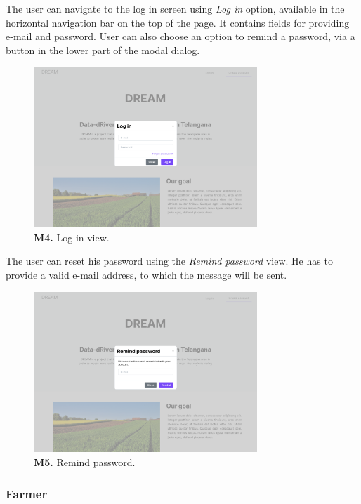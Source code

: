     The user can navigate to the log in screen using \textit{Log in} option, available in the horizontal navigation bar on the top of the page. It contains fields for providing e-mail and password. User can also choose an option to remind a password, via a button in the lower part of the modal dialog.
    \begin{figure}[H]
        \centering
        \includegraphics[width=0.75\textwidth]{mockups/Unreg. user_Log in.png}
        \caption{\textbf{M4.} Log in view.}
        \label{fig:user-log-in}
    \end{figure}
    
    The user can reset his password using the \textit{Remind password} view. He has to provide a valid e-mail address, to which the message will be sent.
    \begin{figure}[H]
        \centering
        \includegraphics[width=0.75\textwidth]{mockups/Unreg. user_Remind password.png}
        \caption{\textbf{M5.} Remind password.}
        \label{fig:user-remind-password}
    \end{figure}
    
    
    \subsubsection{Farmer}
    
